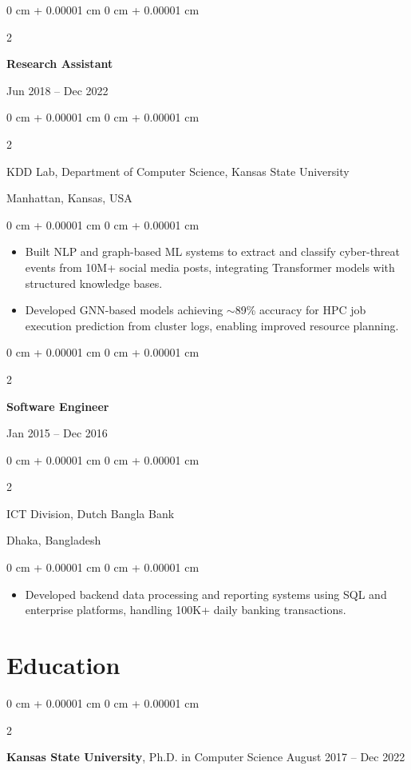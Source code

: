 \documentclass[10pt, letterpaper]{article}
\newenvironment{highlights}{
    \begin{itemize}[
        topsep=0.10 cm,
        parsep=0.10 cm,
        partopsep=0pt,
        itemsep=0pt,
        leftmargin=0 cm + 10pt
    ]
}{
    \end{itemize}
} %
\newenvironment{onecolentry}{
    \begin{adjustwidth}{
        0 cm + 0.00001 cm
    }{
        0 cm + 0.00001 cm
    }
}{
    \end{adjustwidth}
} %
\newenvironment{twocolentry}[2][]{
    \onecolentry
    \def\secondColumn{#2}
    \setcolumnwidth{\fill, 4.5 cm}
    \begin{paracol}{2}
}{
    \switchcolumn \raggedleft \secondColumn
    \end{paracol}
    \endonecolentry
} %
\begin{document}
    \vspace{1mm}

    \begin{twocolentry}{Jun 2018 -- Dec 2022}
        \textbf{Research Assistant}
    \end{twocolentry}
    \begin{twocolentry}{Manhattan, Kansas, USA}
       KDD Lab, Department of Computer Science, Kansas State University
    \end{twocolentry}
    \vspace{0.10 cm}
    \begin{onecolentry}
        \begin{highlights}
            \item Built NLP and graph-based ML systems to extract and classify cyber-threat events from 10M+ social media posts, integrating Transformer models with structured knowledge bases.
            \item Developed GNN-based models achieving $\sim$89\% accuracy for HPC job execution prediction from cluster logs, enabling improved resource planning.
        \end{highlights}
    \end{onecolentry}

    \vspace{0.1 cm}
    \begin{twocolentry}{Jan 2015 -- Dec 2016}
        \textbf{Software Engineer}
    \end{twocolentry}
    \begin{twocolentry}{Dhaka, Bangladesh}
       ICT Division, Dutch Bangla Bank
    \end{twocolentry}

    \begin{onecolentry}
        \begin{highlights}
            \item Developed backend data processing and reporting systems using SQL and enterprise platforms, handling 100K+ daily banking transactions.
        \end{highlights}
    \end{onecolentry}

\section{Education}

        \begin{twocolentry}{
            August 2017 – Dec 2022
        }
            \textbf{Kansas State University}, Ph.D. in Computer Science\end{twocolentry}
\end{document}
